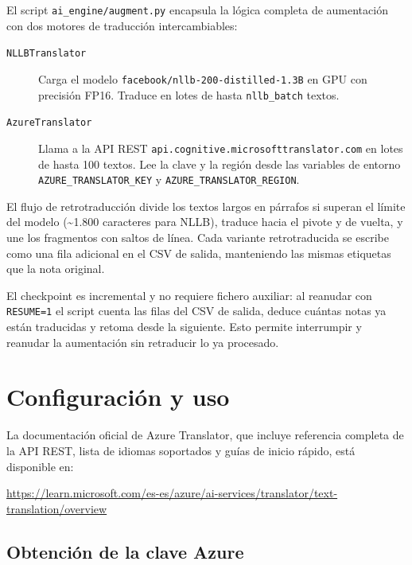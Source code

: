 El script \texttt{ai\_engine/augment.py} encapsula la lógica completa de aumentación con dos motores de traducción intercambiables:

\begin{description}
  \item[\texttt{NLLBTranslator}] Carga el modelo \texttt{facebook/nllb-200-distilled-1.3B} en GPU con precisión FP16. Traduce en lotes de hasta \texttt{nllb\_batch} textos.
  \item[\texttt{AzureTranslator}] Llama a la API REST \texttt{api.cognitive.microsofttranslator.com} en lotes de hasta 100 textos. Lee la clave y la región desde las variables de entorno \texttt{AZURE\_TRANSLATOR\_KEY} y \texttt{AZURE\_TRANSLATOR\_REGION}.
\end{description}

El flujo de retrotraducción divide los textos largos en párrafos si superan el límite del modelo (\textasciitilde 1.800 caracteres para NLLB), traduce hacia el pivote y de vuelta, y une los fragmentos con saltos de línea. Cada variante retrotraducida se escribe como una fila adicional en el CSV de salida, manteniendo las mismas etiquetas que la nota original.

El checkpoint es incremental y no requiere fichero auxiliar: al reanudar con \texttt{RESUME=1} el script cuenta las filas del CSV de salida, deduce cuántas notas ya están traducidas y retoma desde la siguiente. Esto permite interrumpir y reanudar la aumentación sin retraducir lo ya procesado.

\section{Configuración y uso}

La documentación oficial de Azure Translator, que incluye referencia completa de la API REST, lista de idiomas soportados y guías de inicio rápido, está disponible en:

\begin{center}
\url{https://learn.microsoft.com/es-es/azure/ai-services/translator/text-translation/overview}
\end{center}

\subsection{Obtención de la clave Azure}

